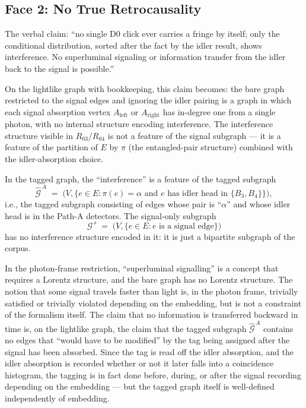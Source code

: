 \documentclass[11pt]{article}
\begin{document}
\subsection{Face 2: No True Retrocausality}

The verbal claim: ``no single D0 click ever carries a fringe by itself; only the conditional distribution, sorted after the fact by the idler result, shows interference. No superluminal signaling or information transfer from the idler back to the signal is possible.''

On the lightlike graph with bookkeeping, this claim becomes: the bare graph restricted to the signal edges and ignoring the idler pairing is a graph in which each signal absorption vertex $A_{\text{left}}$ or $A_{\text{right}}$ has in-degree one from a single photon, with no internal structure encoding interference. The interference structure visible in $R_{03}$/$R_{04}$ is not a feature of the signal subgraph --- it is a feature of the partition of $E$ by $\pi$ (the entangled-pair structure) combined with the idler-absorption choice.

In the tagged graph, the ``interference'' is a feature of the tagged subgraph
\[
\widehat{\mathcal{G}}^{\,A} \;=\; \bigl(V, \{e \in E : \pi(e) = \alpha \text{ and } e \text{ has idler head in } \{B_3, B_4\}\}\bigr),
\]
i.e., the tagged subgraph consisting of edges whose pair is ``$\alpha$'' and whose idler head is in the Path-A detectors. The signal-only subgraph
\[
\mathcal{G}^{\,s} \;=\; \bigl(V, \{e \in E : e \text{ is a signal edge}\}\bigr)
\]
has no interference structure encoded in it: it is just a bipartite subgraph of the corpus.

In the photon-frame restriction, ``superluminal signalling'' is a concept that requires a Lorentz structure, and the bare graph has no Lorentz structure. The notion that some signal travels faster than light is, in the photon frame, trivially satisfied or trivially violated depending on the embedding, but is not a constraint of the formalism itself. The claim that no information is transferred backward in time is, on the lightlike graph, the claim that the tagged subgraph $\widehat{\mathcal{G}}^{\,A}$ contains no edges that ``would have to be modified'' by the tag being assigned after the signal has been absorbed. Since the tag is read off the idler absorption, and the idler absorption is recorded whether or not it later falls into a coincidence histogram, the tagging is in fact done before, during, or after the signal recording depending on the embedding --- but the tagged graph itself is well-defined independently of embedding.
\end{document}

